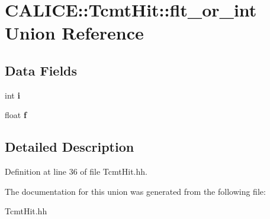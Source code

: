\section{CALICE::TcmtHit::flt\_\-or\_\-int Union Reference}
\label{unionCALICE_1_1TcmtHit_1_1flt__or__int}
\subsection*{Data Fields}
\begin{DoxyCompactItemize}
\item 
int {\bfseries i}\label{unionCALICE_1_1TcmtHit_1_1flt__or__int_af9190e5d7578fdb27def516352cdc7a5}

\item 
float {\bfseries f}\label{unionCALICE_1_1TcmtHit_1_1flt__or__int_ac5eb6eb93f72bf7f388dff218559a362}

\end{DoxyCompactItemize}


\subsection{Detailed Description}


Definition at line 36 of file TcmtHit.hh.

The documentation for this union was generated from the following file:\begin{DoxyCompactItemize}
\item 
TcmtHit.hh\end{DoxyCompactItemize}
